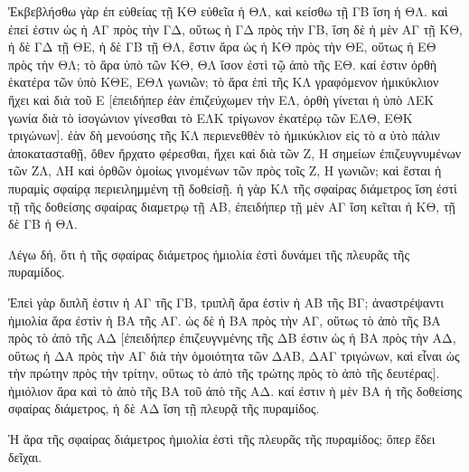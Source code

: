 \begin{Parallel}{}{}
{{\greekfont Ἐκβεβλήσθω γὰρ ἐπ εὐθείας τῇ ΚΘ εὐθεῖα ἡ ΘΛ, καὶ
κείσθω τῇ ΓΒ ἴση ἡ ΘΛ. καὶ ἐπεί ἐστιν ὡς ἡ ΑΓ πρὸς
τὴν ΓΔ, οὕτως ἡ ΓΔ πρὸς τὴν ΓΒ, ἴση δὲ ἡ μὲν ΑΓ τῇ
ΚΘ, ἡ δὲ ΓΔ τῇ ΘΕ, ἡ δὲ ΓΒ τῇ ΘΛ, ἔστιν ἄρα ὡς ἡ ΚΘ πρὸς
τὴν ΘΕ, οὕτως ἡ ΕΘ πρὸς τὴν ΘΛ; τὸ ἄρα ὑπὸ τῶν
ΚΘ, ΘΛ ἴσον ἐστὶ τῷ ἀπὸ τῆς ΕΘ. καί ἐστιν ὀρθὴ ἑκατέρα
τῶν ὑπὸ ΚΘΕ, ΕΘΛ γωνιῶν; τὸ ἄρα ἐπὶ τῆς ΚΛ γραφόμενον
ἡμικύκλιον ἥχει καὶ διὰ τοῦ Ε [ἐπειδήπερ ἐὰν ἐπιζεύχωμεν
τὴν ΕΛ, ὀρθὴ γίνεται ἡ ὑπὸ ΛΕΚ γωνία διὰ τὸ ἰσογώνιον
γίνεσθαι τὸ ΕΛΚ τρίγωνον ἑκατέρῳ τῶν ΕΛΘ, ΕΘΚ τριγώνων].
ἐὰν δὴ μενούσης τῆς ΚΛ περιενεθθὲν τὸ ἡμικύκλιον
εἰς τὸ α ὐτὸ πάλιν ἀποκατασταθῇ, ὅθεν ἤρχατο φέρεσθαι,
ἥχει καὶ διὰ τῶν Ζ, Η σημείων ἐπιζευγνυμένων
τῶν ΖΛ, ΛΗ καὶ ὀρθῶν ὁμοίως γινομένων τῶν πρὸς τοῖς
Ζ, Η γωνιῶν; καὶ ἔσται ἡ πυραμὶς σφαίρᾳ περιειλημμένη τῇ
δοθείσῇ. ἡ γὰρ ΚΛ τῆς σφαίρας διάμετρος ἴση ἐστὶ τῇ
τῆς δοθείσης σφαίρας διαμετρῳ τῇ ΑΒ, ἐπειδήπερ τῇ μὲν
ΑΓ ἴση κεῖται ἡ ΚΘ, τῇ δὲ ΓΒ ἡ ΘΛ.}

{\greekfont Λέγω δή, ὅτι ἡ τῆς σφαίρας διάμετρος ἡμιολία
ἐστὶ δυνάμει τῆς πλευρᾶς τῆς πυραμίδος.}

{\greekfont Ἐπεὶ γὰρ διπλῆ ἐστιν ἡ ΑΓ τῆς ΓΒ, τριπλῆ ἄρα
ἐστὶν ἡ ΑΒ τῆς ΒΓ; ἀναστρέψαντι ἡμιολία ἄρα ἐστὶν
ἡ ΒΑ τῆς
ΑΓ. ὡς δὲ ἡ ΒΑ πρὸς τὴν ΑΓ, οὕτως
τὸ ἀπὸ τῆς ΒΑ πρὸς τὸ ἀπὸ τῆς ΑΔ [ἐπειδήπερ ἐπιζευγνμένης
τῆς ΔΒ ἐστιν ὡς ἡ ΒΑ πρὸς τὴν ΑΔ, οὕτως ἡ ΔΑ πρὸς
τὴν ΑΓ διὰ τὴν ὁμοιότητα τῶν ΔΑΒ, ΔΑΓ τριγώνων, καὶ
εἶναι ὡς τὴν πρώτην πρὸς τὴν τρίτην, οὕτως
τὸ ἀπὸ τῆς τρώτης πρὸς τὸ ἀπὸ τῆς δευτέρας].
ἡμιόλιον ἄρα καὶ τὸ ἀπὸ τῆς ΒΑ τοῦ ἀπὸ τῆς ΑΔ. καί
ἐστιν ἡ μὲν ΒΑ ἡ τῆς δοθείσης
σφαίρας διάμετρος, ἡ δὲ ΑΔ ἴση τῇ πλευρᾷ
τῆς πυραμίδος.}

{\greekfont Ἡ ἄρα τῆς σφαίρας διάμετρος ἡμιολία ἐστὶ τῆς
πλευρᾶς τῆς πυραμίδος; ὅπερ ἔδει δεῖχαι.}}

\end{Parallel}
